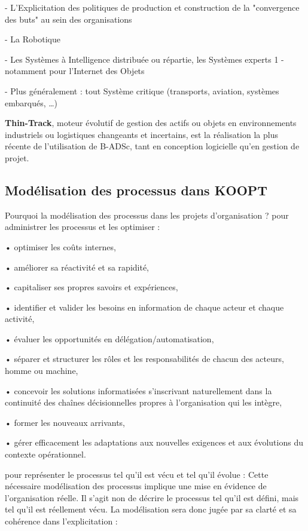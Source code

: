- L'Explicitation des politiques de production et construction de la "convergence des buts" au sein des organisations

- La Robotique 

- Les Systèmes à Intelligence distribuée ou répartie, les Systèmes experts 1 - notamment pour l'Internet des Objets

- Plus généralement : tout Système critique (transports, aviation, systèmes embarqués, …) 
 
 
\textbf{Thin-Track}, moteur évolutif de gestion des actifs ou objets en environnements industriels ou logistiques changeants et incertains, est la réalisation la plus récente de l'utilisation de B-ADSc, tant en conception logicielle qu'en gestion de projet. \cite{badsc}

\subsection{Modélisation des processus dans KOOPT}

Pourquoi la modélisation des processus dans les projets d'organisation ?
pour administrer les processus et les optimiser : 

    • optimiser les coûts internes,
    
    • améliorer sa réactivité et sa rapidité,
    
    • capitaliser ses propres savoirs et expériences,
    
    • identifier et valider les besoins en information de chaque acteur et chaque activité,
    
    • évaluer les opportunités en délégation/automatisation,
    
    • séparer et structurer les rôles et les responsabilités de chacun des acteurs, homme ou machine,
    
    • concevoir les solutions informatisées s'inscrivant naturellement dans la continuité des chaînes
      décisionnelles propres à l’organisation qui les intègre,
    
    • former les nouveaux arrivants,
    
    • gérer efficacement les adaptations aux nouvelles exigences et aux évolutions du contexte opérationnel.
     
     
pour représenter le processus tel qu'il est vécu et tel qu'il évolue : 
Cette nécessaire modélisation des processus implique une mise en évidence de l'organisation réelle.
Il s'agit non de décrire le processus tel qu'il est défini, mais tel qu'il est réellement vécu.
La modélisation sera donc jugée par sa clarté et sa cohérence dans l’explicitation :

